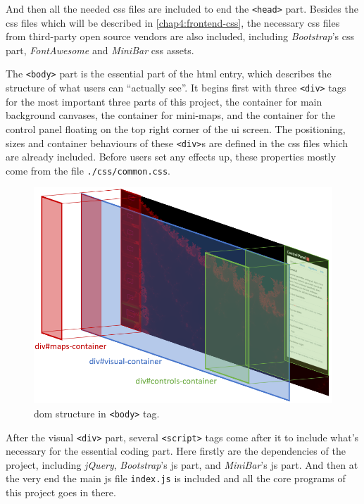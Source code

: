 And then all the needed \gls{css} files are included to end the \texttt{<head>} part. Besides the \gls{css} files which will be described in \ref{chap4:frontend-css}, the necessary \gls{css} files from third-party open source vendors are also included, including \emph{Bootstrap}'s \gls{css} part, \emph{FontAwesome} and \emph{MiniBar} \gls{css} assets.

The \texttt{<body>} part is the essential part of the \gls{html} entry, which describes the structure of what users can ``actually see''. It begins first with three \texttt{<div>} tags for the most important three parts of this project, the container for main background canvases, the container for mini-maps, and the container for the control panel floating on the top right corner of the \gls{ui} screen. The positioning, sizes and container behaviours of these \texttt{<div>}s are defined in the \gls{css} files which are already included. Before users set any effects up, these properties mostly come from the file \texttt{./css/common.css}.

\begin{figure}[th]
\centering
\includegraphics[width=\textwidth,keepaspectratio]{Figures/Chapter4/rootdom.png}
\decoRule
\caption[DOM Body Structure]{\gls{dom} structure in \texttt{<body>} tag.}
\label{fig:rootdom}
\end{figure}

After the visual \texttt{<div>} part, several \texttt{<script>} tags come after it to include what's necessary for the essential coding part. Here firstly are the dependencies of the project, including \emph{jQuery}, \emph{Bootstrap}'s \gls{js} part, and \emph{MiniBar}'s \gls{js} part. And then at the very end the main \gls{js} file \texttt{index.js} is included and all the core programs of this project goes in there.

